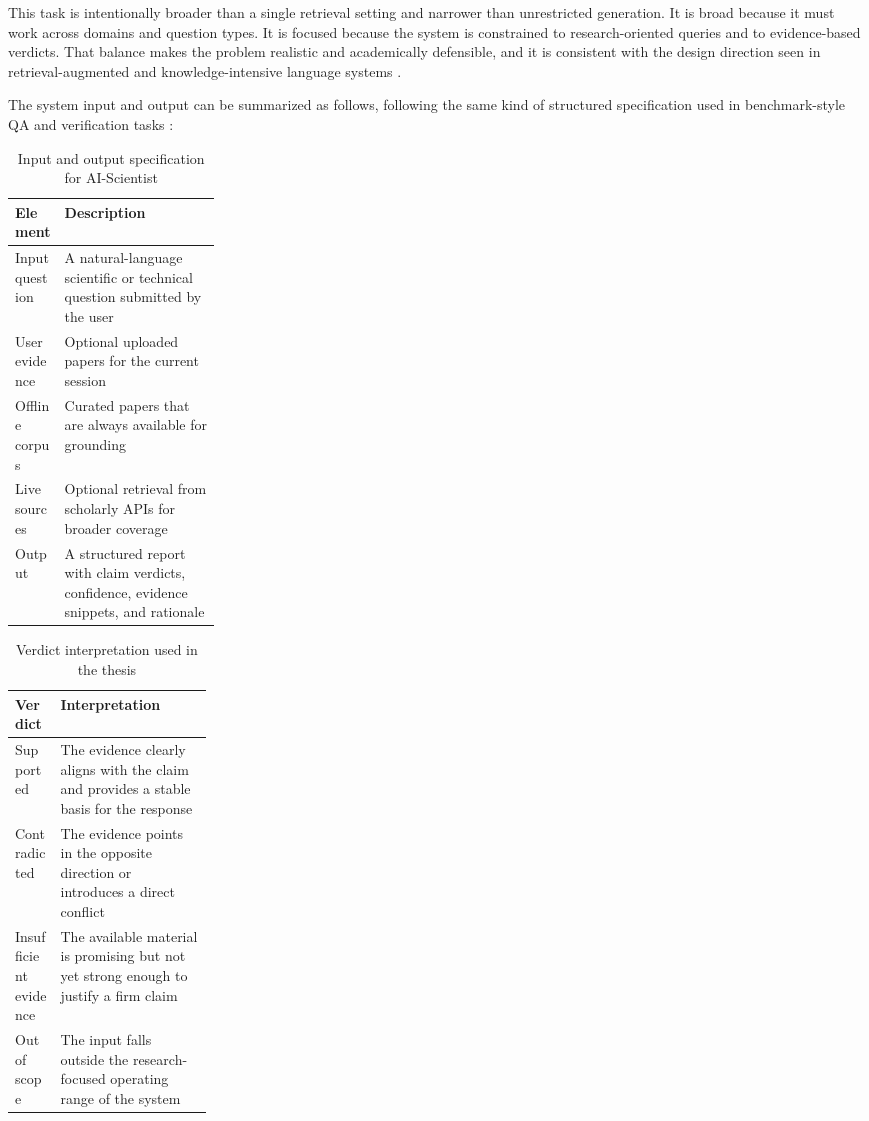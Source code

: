 This task is intentionally broader than a single retrieval setting and narrower than unrestricted generation. It is broad because it must work across domains and question types. It is focused because the system is constrained to research-oriented queries and to evidence-based verdicts. That balance makes the problem realistic and academically defensible, and it is consistent with the design direction seen in retrieval-augmented and knowledge-intensive language systems \cite{lewis2020rag,petroni2020kilt,borgeaud2022retro}.

The system input and output can be summarized as follows, following the same kind of structured specification used in benchmark-style QA and verification tasks \cite{rajpurkar2016squad,joshi2017triviaqa,yang2018hotpotqa}:
\begin{table}[H]
\centering
\begin{tabularx}{\linewidth}{>{\raggedright\arraybackslash}p{0.24\linewidth} >{\raggedright\arraybackslash}X}
\toprule
Element & Description \\
\midrule
Input question & A natural-language scientific or technical question submitted by the user \\
User evidence & Optional uploaded papers for the current session \\
Offline corpus & Curated papers that are always available for grounding \\
Live sources & Optional retrieval from scholarly APIs for broader coverage \\
Output & A structured report with claim verdicts, confidence, evidence snippets, and rationale \\
\bottomrule
\end{tabularx}
\caption{Input and output specification for AI-Scientist}
\end{table}

\begin{table}[H]
\centering
\begin{tabularx}{\linewidth}{>{\raggedright\arraybackslash}p{0.23\linewidth} >{\raggedright\arraybackslash}X}
\toprule
Verdict & Interpretation \\
\midrule
Supported & The evidence clearly aligns with the claim and provides a stable basis for the response \\
Contradicted & The evidence points in the opposite direction or introduces a direct conflict \\
Insufficient evidence & The available material is promising but not yet strong enough to justify a firm claim \\
Out of scope & The input falls outside the research-focused operating range of the system \\
\bottomrule
\end{tabularx}
\caption{Verdict interpretation used in the thesis}
\end{table}


